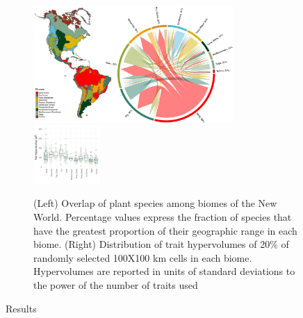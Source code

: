 \documentclass[final]{beamer}
\newlength{\sepwid}
\newlength{\onecolwid}
\newlength{\twocolwid}
\begin{document}
\begin{frame}[t]
\begin{columns}[t]
\begin{column}{\onecolwid}
    \end{column}


    \begin{column}{\sepwid}\end{column}			%
    \begin{column}{\twocolwid}							%

\begin{figure}[h]
	\centering
	\includegraphics[width=0.75\textwidth]{./figures/Figure1.pdf}
	~
	\includegraphics[width=0.25\textwidth]{./figures/Hypervolume_sp_sample_gaussian20perc.pdf}
	\caption{ \footnotesize (Left) Overlap of plant species among biomes of the New World. Percentage values express the fraction of species that have the greatest proportion of their geographic range in each biome. (Right) Distribution of trait hypervolumes of 20\% of randomly selected 100X100 km cells in each biome. Hypervolumes are reported in units of standard deviations to the power of the number of traits used}
	\label{fig:map}
\end{figure}



\begin{block}{Results}

\end{block}
		 
\begin{multicols}{2}


\end{multicols}
\end{column}
\end{columns}
\end{frame}
\end{document}
